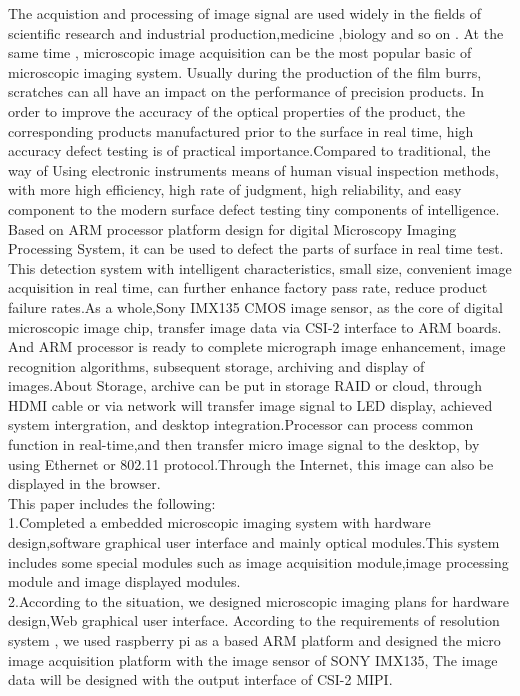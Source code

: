 \begin{enabstract}
	The acquistion and processing of image signal are used widely in the fields of scientific research and industrial production,medicine ,biology and so on . At the same time , microscopic image acquisition can be the most popular basic of microscopic imaging system. Usually during the production of the film burrs, scratches  can all have an impact on the performance of precision products. In order to improve the accuracy of the optical properties of the product, the corresponding products manufactured prior to the surface in real time, high accuracy defect testing is of practical importance.Compared to traditional, the way of Using electronic instruments  means of human visual inspection methods, with more high efficiency, high rate of judgment, high reliability, and easy component to the modern surface defect testing tiny components of intelligence.\\
	Based on ARM processor platform design for digital Microscopy Imaging Processing System, it can be used to defect the parts of surface in real time test. This detection system with intelligent characteristics, small size, convenient image acquisition in real time, can further enhance factory pass rate, reduce product failure rates.As a whole,Sony IMX135 CMOS image sensor, as the core of digital microscopic image chip, transfer image data via CSI-2 interface to ARM boards. And ARM processor is ready to complete micrograph image enhancement, image recognition algorithms, subsequent storage, archiving and display of images.About Storage, archive can be put in storage RAID or cloud, through HDMI cable or via network will transfer image signal to LED display, achieved system intergration, and desktop integration.Processor can process common function in real-time,and then transfer micro image signal to the desktop, by using Ethernet or 802.11 protocol.Through the Internet, this image can also be displayed in the browser.\\
	This paper includes the following:\\
	1.Completed a embedded microscopic imaging system with hardware design,software graphical user interface and mainly optical modules.This system includes some special modules such as image acquisition module,image processing module and image displayed modules. \\
	2.According to the situation, we designed microscopic imaging plans for hardware design,Web graphical user interface. According to the requirements of resolution system , we used raspberry pi as a based ARM platform and designed the micro image acquisition platform with the image sensor of SONY IMX135, The image data will be designed with the output interface of CSI-2 MIPI.\\

\end{enabstract}
